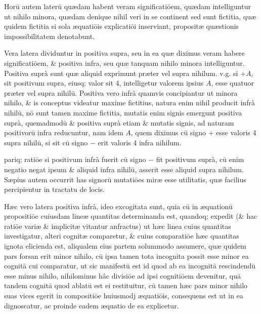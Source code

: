 \documentclass[11pt,a4paper]{article}
\begin{document}
Horū autem laterū quædam habent veram significatiōem, quædam intelliguntur ut nihilo minora, quædam denique nihil veri in se continent sed sunt fictitia, quæ quidem fictitia si sola æquatiōis explicatiōi inserviant, propositæ quæstionis impossibilitatem denotabunt.

Vera latera dividuntur in positiva supra, seu in ea quæ diximus veram habere significatiōem, \& positiva infra, seu quæ tanquam nihilo minora intelliguntur. Positiva suprà sunt quæ aliquid exprimunt præter vel supra nihilum. v.g. si $+A$, sit positivum supra, eiusq; valor sit 4, intelligetur valorem ipsius $A$, esse quatuor præter vel supra nihilū. Positiva vero infrà quamvis concipiantur ut minora nihilo, \& is conceptus videatur maxime fictitius, natura enim nihil producit infrà nihilū, nō sunt tamen maxime fictitia, mutatis enim signis emergunt positiva suprà, quemadmodū \& positiva suprà etiam \& mutatis signis, ad naturam positivorū infra reducuntur, nam idem $A$, quem diximus cū signo $+$ esse valoris 4 supra nihilū, si sit cū signo $-$ erit valoris 4 infra nihilum.


pariq; ratiōe si positivum infrà fuerit cū signo $-$ fit positivum suprà, cū enim negatio negat ipsum \& aliquid infra nihilū, asserit esse aliquid supra nihilum. Sæpius autem occurrit has signorū mutatiōes miræ esse utilitatis, quæ facilius percipientur in tractatu de locis.

Hæc vero latera positiva infrà, ideo excogitata sunt, quia cū in æquationū propositiōe cuiusdam lineæ quantitas determinanda est, quandoq; expedit (\& hac ratiōe variæ \& implicitæ vitantur anfractus) ut hæc linea cuius quantitas investigatur, alteri cognitæ comparetur, \& cuius comparatiōe hæc quantitas ignota elicienda est, aliqualem eius partem solummodo assumere, quæ quidem pars forsan erit minor nihilo, cū ipsa tamen tota incognita possit esse minor ea cognitā cui comparatur, ut sic manifestū est id quod ab ea incognitā rescindendū esse minus nihilo, nihilominus hâc divisiōe ad ipsi cognitiōem devenitur, quā tandem cognitā quod ablatū est ei restituitur, cū tamen hæc pars minor nihilo suas vices egerit in compositiōe huiusmodj æquatiōis, consequens est ut in ea dignoscatur, ac proinde eadem æquatio de ea explicetur.
\end{document}
